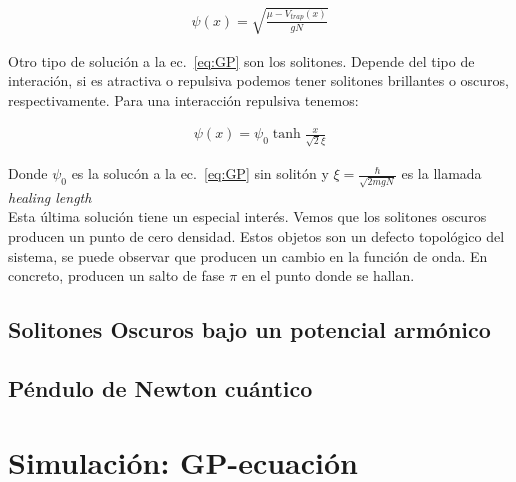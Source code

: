 \documentclass[12pt]{article}
\begin{document}
 \begin{align}
 \psi(x)=\sqrt{\frac{\mu-V_{trap}(x)}{gN}}
 \label{eq:TF}
 \end{align}
 
Otro tipo de soluci\'on a la ec.~\eqref{eq:GP}  son los solitones. Depende del tipo de interaci\'on, si es atractiva o repulsiva podemos tener solitones brillantes o oscuros, respectivamente. Para una interacci\'on repulsiva tenemos:

 \begin{align}
\psi(x)=\psi_0 \tanh{\frac{x}{\sqrt{2}\xi}}
\label{eq:soliton}
\end{align}

Donde $\psi_0$ es la soluc\'on a la ec.~\eqref{eq:GP} sin solit\'on y $\xi=\frac{\hbar}{\sqrt{2mgN}}$ es la llamada \textit{healing length}
\\

Esta \'ultima soluci\'on tiene un especial inter\'es. Vemos que los solitones oscuros producen un punto de cero densidad. Estos objetos son un defecto topol\'ogico del sistema, se puede observar que producen un cambio en la funci\'on de onda. En concreto, producen un salto de fase $\pi$ en el punto donde se hallan.
\\

\subsection{Solitones Oscuros bajo un potencial arm\'onico}
\subsection{P\'endulo de Newton cu\'antico}

\section{Simulaci\'on: GP-ecuaci\'on}
\end{document}
